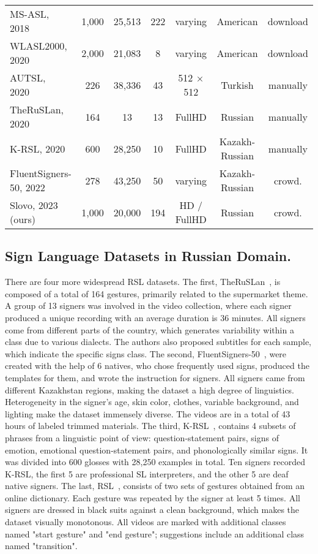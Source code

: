 \documentclass[runningheads]{llncs}
\begin{document}
\begin{table*}
{\begin{tabular}{|l|c|c|c|c|c|c|}
MS-ASL, 2018~\cite{msasl} & 1,000 & 25,513 & 222 & varying & American & download\\
WLASL2000, 2020~\cite{wlasl} & 2,000 & 21,083 & 8 & varying & American & download\\
AUTSL, 2020~\cite{autosl} & 226 & 38,336 & 43 & 512 × 512 & Turkish & manually\\
TheRuSLan, 2020~\cite{kagirov2020theruslan} & 164 & 13 & 13 & FullHD & Russian & manually\\
K-RSL, 2020~\cite{imashev2020k} & 600 & 28,250 & 10 & FullHD & Kazakh-Russian & manually\\
FluentSigners-50, 2022~\cite{mukushev2022fluentsigners} & 278 & 43,250 & 50 & varying & Kazakh-Russian & crowd.\\
\rowcolor{LightCyan}
Slovo, 2023 (ours) & 1,000 & 20,000 & 194 & HD / FullHD & Russian  & crowd.\\
\hline
\end{tabular}}
\end{table*}
\vspace{-0.8cm}

\subsection{Sign Language Datasets in Russian Domain.}

There are four more widespread RSL datasets. The first, TheRuSLan~\cite{kagirov2020theruslan}, is composed of a total of 164 gestures, primarily related to the supermarket theme. A group of 13 signers was involved in the video collection, where each signer produced a unique recording with an average duration is 36 minutes. All signers come from different parts of the country, which generates variability within a class due to various dialects. The authors also proposed subtitles for each sample, which indicate the specific signs class. The second, FluentSigners-50~\cite{mukushev2022fluentsigners}, were created with the help of 6 natives, who chose frequently used signs, produced the templates for them, and wrote the instruction for signers. All signers came from different Kazakhstan regions, making the dataset a high degree of linguistics. Heterogeneity in the signer's age, skin color, clothes, variable background, and lighting make the dataset immensely diverse. The videos are in a total of 43 hours of labeled trimmed materials. The third, K-RSL~\cite{imashev2020k}, contains 4 subsets of phrases from a linguistic point of view: question-statement pairs, signs of emotion, emotional question-statement pairs, and phonologically similar signs. It was divided into 600 glosses with 28,250 examples in total. Ten signers recorded K-RSL, the first 5 are professional SL interpreters, and the other 5 are deaf native signers. The last, RSL~\cite{grif2021raspoznavanie}, consists of two sets of gestures obtained from an online dictionary. Each gesture was repeated by the signer at least 5 times. All signers are dressed in black suits against a clean background, which makes the dataset visually monotonous. All videos are marked with additional classes named "start gesture" and "end gesture"; suggestions include an additional class named "transition".
\end{document}
